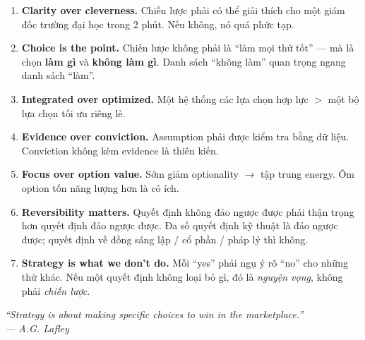 \documentclass[11pt,a4paper]{article}
\begin{document}
\begin{enumerate}
\item \textbf{Clarity over cleverness.} Chiến lược phải có thể giải thích cho
một giám đốc trường đại học trong 2 phút. Nếu không, nó quá phức tạp.

\item \textbf{Choice is the point.} Chiến lược không phải là ``làm mọi thứ tốt''
--- mà là chọn \textbf{làm gì} và \textbf{không làm gì}. Danh sách ``không làm''
quan trọng ngang danh sách ``làm''.

\item \textbf{Integrated over optimized.} Một hệ thống các lựa chọn hợp lực $>$
một bộ lựa chọn tối ưu riêng lẻ.

\item \textbf{Evidence over conviction.} Assumption phải được kiểm tra bằng dữ
liệu. Conviction không kèm evidence là thiên kiến.

\item \textbf{Focus over option value.} Sớm giảm optionality $\to$ tập trung
energy. Ôm option tốn năng lượng hơn là có ích.

\item \textbf{Reversibility matters.} Quyết định không đảo ngược được phải
thận trọng hơn quyết định đảo ngược được. Đa số quyết định kỹ thuật là
đảo ngược được; quyết định về đồng sáng lập / cổ phần / pháp lý thì không.

\item \textbf{Strategy is what we don't do.} Mỗi ``yes'' phải ngụ ý rõ ``no'' cho
những thứ khác. Nếu một quyết định không loại bỏ gì, đó là \textit{nguyện vọng},
không phải \textit{chiến lược}.
\end{enumerate}

\vfill

\begin{center}
\small\itshape\color{mid}
``Strategy is about making specific choices to win in the marketplace.''\\
--- A.G. Lafley
\end{center}
\end{document}
